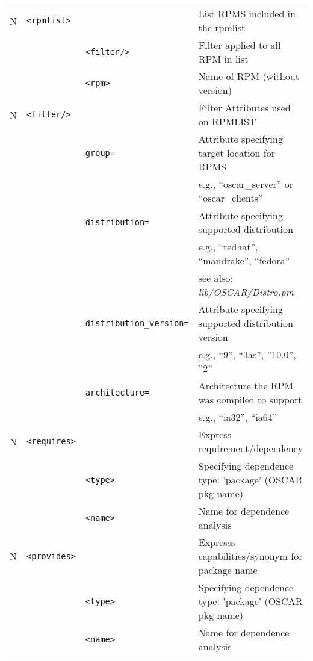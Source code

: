 \begin{table}[h!]
\begin{small}
\begin{center}
\begin{tabular}{|c|l|l|l|}
  N & \verb|<rpmlist>|
		&    
		& List RPMS included in the rpmlist         
		\\\cline{3-4}
%
	& 
		& \verb|<filter/>| 
		& Filter applied to all RPM in list         
		\\\cline{3-4}
%
    & 
		& \verb|<rpm>|    
		& Name of RPM (without version)             
		\\\hline

  N & \verb|<filter/>|
		&     
		& Filter Attributes used on RPMLIST                 
		\\\cline{3-4}
%
    & 
		& \verb|group=|   
		& Attribute specifying target location for RPMS     
		\\
    & 
		&                 
		& e.g., ``oscar\_server'' or ``oscar\_clients''     
		\\\cline{3-4}
%
    & 
		& \verb|distribution=|
		& Attribute specifying supported distribution   
		\\
    & 
		&                 
		& e.g., ``redhat'', ``mandrake'', ``fedora''
		\\
    & 
		&                 
		& see also: \emph{lib/OSCAR/Distro.pm}              
		\\\cline{3-4}
%
    & 
		& \verb|distribution_version=|
		& Attribute specifying supported distribution version  
		\\
    & 
		&                 
		& e.g., ``9'', ``3as'', ''10.0'', ''2''
		\\\cline{3-4}
%
    & 
		& \verb|architecture=|    
		& Architecture the RPM was compiled to support      
		\\
    & 
		&                 
		& e.g., ``ia32'', ``ia64''                          
		\\\hline

  N & \verb|<requires>|
  		&   
		& Express requirement/dependency 
		\\\cline{3-4}
%
    & 
		& \verb|<type>|    
		& Specifying dependence type: 'package'  (OSCAR pkg name)
		\\\cline{3-4}
	&
%
		& \verb|<name>|
		& Name for dependence analysis
		\\\hline

  N & \verb|<provides>|
  		&   
		& Expresss capabilities/synonym for package name
		\\\cline{3-4}
%
    & 
		& \verb|<type>|    
		& Specifying dependence type: 'package'  (OSCAR pkg name)
		\\\cline{3-4}
%
	&
		& \verb|<name>|
		& Name for dependence analysis
		\\\hline


\end{tabular}
\end{center}
\end{small}
\end{table}
